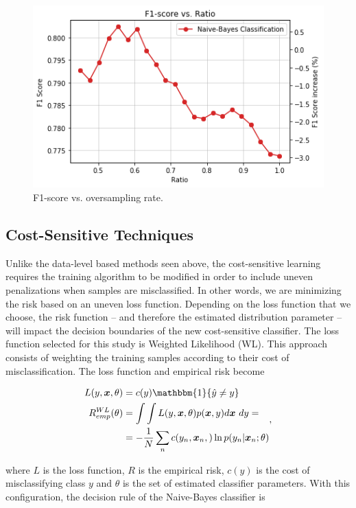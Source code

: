 \documentclass[conference]{IEEEtran}
\begin{document}
	\begin{figure}[h]
		\includegraphics[scale=0.45]{Oversampling_F1_Score}
		\centering
		\caption{F1-score vs. oversampling rate.}
		\label{fig:Oversampling_F1_Score}
	\end{figure}

	\subsection{Cost-Sensitive Techniques}
	Unlike the data-level based methods seen above, the cost-sensitive learning requires the training algorithm to be modified in order to include uneven penalizations when samples are misclassified. In other words, we are minimizing the risk based on an uneven loss function. Depending on the loss function that we choose, the risk function -- and therefore the estimated distribution parameter -- will impact the decision boundaries of the new cost-sensitive classifier. The loss function selected for this study is Weighted Likelihood (WL). This approach consists of weighting the training samples according to their cost of misclassification. The loss function and empirical risk become
	
	\begin{equation*}
	\begin{aligned} \label{costWL}
			L(y,\boldsymbol x, \theta) &= c(y)\mathbbm{1}\{ \hat y \neq y \} \\
			R^{WL}_{emp}(\theta) &= \int \int L(y,\boldsymbol x, \theta) p(\boldsymbol x, y) d\boldsymbol x \text{ }dy=\\
				      &=-\frac{1}{N} \sum_n c(y_n,\boldsymbol x_n,) \ln p(y_n | \boldsymbol x_n;\theta)
		\end{aligned},
	\end{equation*}
	
	where $L$ is the loss function, $R$ is the empirical risk, $c(y)$ is the cost of misclassifying class $y$ and $\theta$ is the set of estimated classifier parameters. With this configuration, the decision rule of the Naive-Bayes classifier is
	
\end{document}
